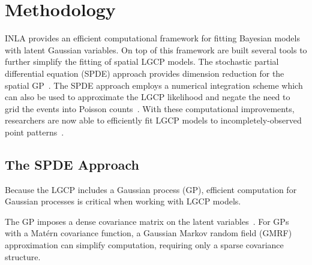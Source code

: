 \documentclass[]{interact}
\begin{document}







\section{Methodology}

INLA provides an efficient computational framework for fitting Bayesian models
with latent Gaussian variables. On top of this framework are built several
tools to further simplify the fitting of spatial LGCP models. The stochastic
partial differential equation (SPDE) approach provides dimension reduction for
the spatial GP~\cite{lindgrenetal}. The SPDE approach employs a numerical
integration scheme which can also be used to approximate the LGCP likelihood
and negate the need to grid the events into Poisson counts~\cite{simpsonetal}.
With these computational improvements, researchers are now able to efficiently
fit LGCP models to incompletely-observed point patterns~\cite{yuanetal}.  


\subsection{The SPDE Approach}

Because the LGCP includes a Gaussian process (GP), efficient computation for
Gaussian processes is critical when working with LGCP models.

The GP imposes a dense covariance matrix on the latent variables~\cite{rinla}.
For GPs with a Mat\'{e}rn covariance function, a Gaussian Markov random field
(GMRF) approximation can simplify computation, requiring only a sparse
covariance structure.
\end{document}
